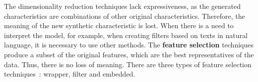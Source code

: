 \documentclass{ieeeaccess}
\begin{document}
The dimensionality reduction techniques lack expressiveness, as the generated characteristics are combinations of other original characteristics. Therefore, the meaning of the new synthetic characteristic is lost. When there is a need to interpret the model, for example, when creating filters based on texts in natural language, it is necessary to use other methods. The \textbf{feature selection} techniques produce a subset of the original features, which are the best representatives of the data. Thus, there is no loss of meaning. There are three types of feature selection techniques~\cite{AndreoniLopez2019}: wrapper, filter and embedded.

\end{document}
